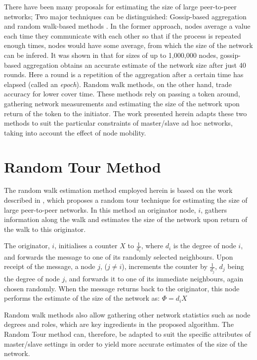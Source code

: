 \documentclass[twocolumn,10pt,conference]{IEEEtran}
\begin{document}
There have been many proposals for estimating the size of large peer-to-peer networks; Two major techniques can be 
distinguished: Gossip-based aggregation\cite{ref21,ref22} and random walk-based methods \cite{ref20,ref23}. In the former approach, nodes average a value each time they 
communicate with each other so that if the process is repeated enough times, nodes would have some average, from which 
the size of the network can be infered. It was shown in \cite{ref24} that for sizes of up to 1,000,000 nodes, 
gossip-based aggregation obtains an accurate estimate of the network size after just 40 rounds. Here a round is a repetition 
of the aggregation after a certain time has elapsed (called an \textit{epoch}). Random walk methods, on the other hand, 
trade accuracy for lower cover time. These methods rely on passing a token around, gathering network measurements and estimating the size 
of the network upon return of the token to the initiator. The 
work presented herein adapts these two methods to suit the particular constraints of master/slave ad hoc networks, taking into account the effect of node mobility.

\section{Random Tour Method}
The random walk estimation method employed herein is based on the work described in \cite{ref20}, which 
proposes a random tour technique for estimating the size of large peer-to-peer networks. In this method an originator node, 
$i$, gathers information along the walk and estimates the size of the network upon return of the walk to this originator. 

The originator, $i$, initialises a counter $X$ to $\frac{1}{d_i}$, where $d_i$ is the degree of node $i$, 
and forwards the message to one of its randomly selected neighbours. Upon receipt of the message, a node $j$, ($j\neq i$), 
increments the counter by $\frac{1}{d_j}$, $d_j$ being the degree of node $j$, and forwards it to one of its immediate 
neighbours, again chosen randomly.
When the message returns back to the originator, this node performs the estimate of the size of the network as: 
$\Phi=d_iX$

Random walk methods also allow gathering other network statistics \cite{ref25} such as node degrees and roles, which are 
key ingredients in the proposed algorithm. The Random Tour method \cite{ref20} can, therefore, be adapted to suit the 
specific attributes of master/slave settings in order to yield more accurate estimates of the size of the network. 
\end{document}
